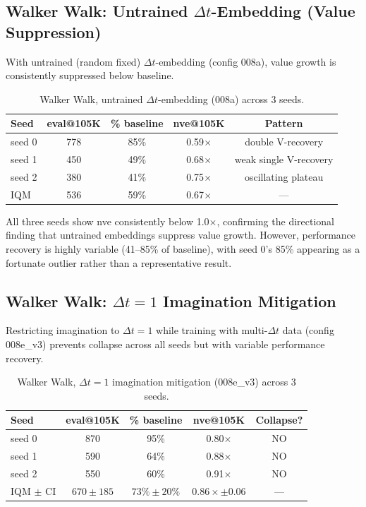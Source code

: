 \documentclass[10pt,letterpaper]{article}
\begin{document}
\subsection{Walker Walk: Untrained $\Delta t$-Embedding (Value Suppression)}
\label{sec:walker-untrained}

With untrained (random fixed) $\Delta t$-embedding (config 008a), value growth is consistently suppressed below baseline.

\begin{table}[h]
\centering
\caption{Walker Walk, untrained $\Delta t$-embedding (008a) across 3 seeds.}
\label{tab:walker-008a}
\begin{tabular}{lcccc}
\toprule
Seed & eval@105K & \% baseline & nve@105K & Pattern \\
\midrule
seed 0 & 778 & 85\% & 0.59$\times$ & double V-recovery \\
seed 1 & 450 & 49\% & 0.68$\times$ & weak single V-recovery \\
seed 2 & 380 & 41\% & 0.75$\times$ & oscillating plateau \\
\midrule
IQM & 536 & 59\% & 0.67$\times$ & --- \\
\bottomrule
\end{tabular}
\end{table}

All three seeds show nve consistently below 1.0$\times$, confirming the directional finding that untrained embeddings suppress value growth. However, performance recovery is highly variable (41--85\% of baseline), with seed 0's 85\% appearing as a fortunate outlier rather than a representative result.

\subsection{Walker Walk: $\Delta t{=}1$ Imagination Mitigation}
\label{sec:walker-mitigation}

Restricting imagination to $\Delta t{=}1$ while training with multi-$\Delta t$ data (config 008e\_v3) prevents collapse across all seeds but with variable performance recovery.

\begin{table}[h]
\centering
\caption{Walker Walk, $\Delta t{=}1$ imagination mitigation (008e\_v3) across 3 seeds.}
\label{tab:walker-mitigation}
\begin{tabular}{lcccc}
\toprule
Seed & eval@105K & \% baseline & nve@105K & Collapse? \\
\midrule
seed 0 & 870 & 95\% & 0.80$\times$ & NO \\
seed 1 & 590 & 64\% & 0.88$\times$ & NO \\
seed 2 & 550 & 60\% & 0.91$\times$ & NO \\
\midrule
IQM $\pm$ CI & $670 \pm 185$ & $73\% \pm 20\%$ & $0.86\times \pm 0.06$ & --- \\
\bottomrule
\end{tabular}
\end{table}
\end{document}
